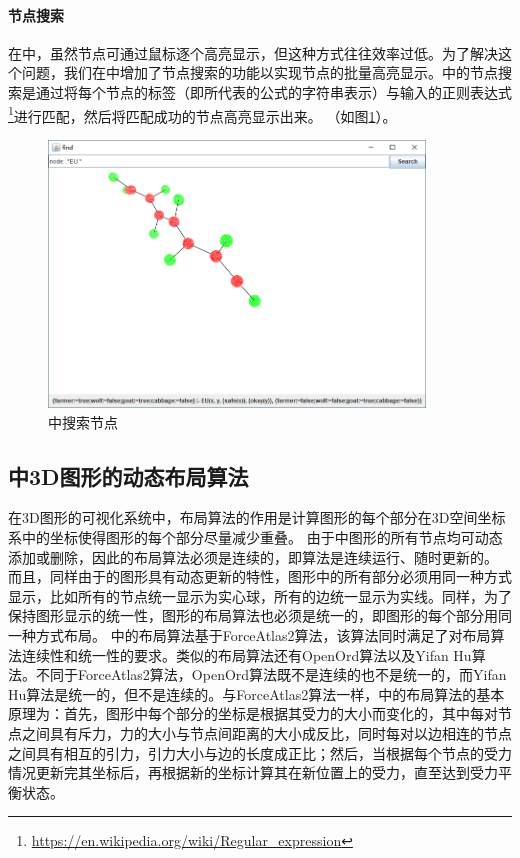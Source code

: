 \paragraph{节点搜索}
在中，虽然节点可通过鼠标逐个高亮显示，但这种方式往往效率过低。为了解决这个问题，我们在中增加了节点搜索的功能以实现节点的批量高亮显示。中的节点搜索是通过将每个节点的标签（即所代表的公式的字符串表示）与输入的正则表达式\footnote{\url{https://en.wikipedia.org/wiki/Regular_expression}}进行匹配，然后将匹配成功的节点高亮显示出来。
（如图\ref{vmdv:prooftree:search}）。
\begin{figure}
	\centering
	\caption{中搜索节点}
	\label{vmdv:prooftree:search}
	\includegraphics[width=10cm]{Img/vmdv_search.png}
	
\end{figure}

\subsection{中3D图形的动态布局算法}
在3D图形的可视化系统中，布局算法的作用是计算图形的每个部分在3D空间坐标系中的坐标使得图形的每个部分尽量减少重叠。
由于中图形的所有节点均可动态添加或删除，因此的布局算法必须是连续的，即算法是连续运行、随时更新的。
而且，同样由于的图形具有动态更新的特性，图形中的所有部分必须用同一种方式显示，比如所有的节点统一显示为实心球，所有的边统一显示为实线。同样，为了保持图形显示的统一性，图形的布局算法也必须是统一的，即图形的每个部分用同一种方式布局。
中的布局算法基于ForceAtlas2算法\cite{jacomy2014forceatlas2}，该算法同时满足了对布局算法连续性和统一性的要求。类似的布局算法还有OpenOrd算法\cite{martin2011openord}以及Yifan Hu算法\cite{yifanhu05}。不同于ForceAtlas2算法，OpenOrd算法既不是连续的也不是统一的，而Yifan Hu算法是统一的，但不是连续的。与ForceAtlas2算法一样，中的布局算法的基本原理为：首先，图形中每个部分的坐标是根据其受力的大小而变化的，其中每对节点之间具有斥力，力的大小与节点间距离的大小成反比，同时每对以边相连的节点之间具有相互的引力，引力大小与边的长度成正比；然后，当根据每个节点的受力情况更新完其坐标后，再根据新的坐标计算其在新位置上的受力，直至达到受力平衡状态。

